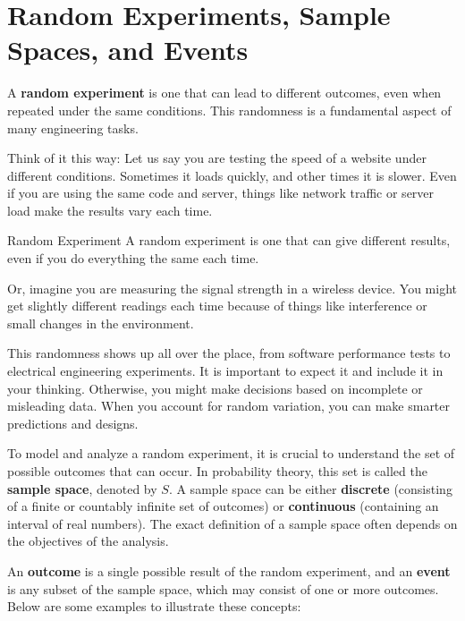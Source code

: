 \section{Random Experiments, Sample Spaces, and Events}
\label{sec:sample_space}
A \textbf{random experiment }is one that can lead to different outcomes, even when repeated under the same conditions. This randomness is a fundamental aspect of many engineering tasks.

Think of it this way: Let us say you are testing the speed of a website under different conditions. Sometimes it loads quickly, and other times it is slower. Even if you are using the same code and server, things like network traffic or server load make the results vary each time.

\begin{definition}{Random Experiment}
    A random experiment is one that can give different results, even if you do everything the same each time.
\end{definition}

Or, imagine you are measuring the signal strength in a wireless device. You might get slightly different readings each time because of things like interference or small changes in the environment.

This randomness shows up all over the place, from software performance tests to electrical engineering experiments. It is important to expect it and include it in your thinking. Otherwise, you might make decisions based on incomplete or misleading data. When you account for random variation, you can make smarter predictions and designs.

To model and analyze a random experiment, it is crucial to understand the set of possible outcomes that can occur. In probability theory, this set is called the \textbf{sample space}, denoted by \( S \). A sample space can be either \textbf{discrete} (consisting of a finite or countably infinite set of outcomes) or \textbf{continuous} (containing an interval of real numbers). The exact definition of a sample space often depends on the objectives of the analysis.

An \textbf{outcome} is a single possible result of the random experiment, and an \textbf{event} is any subset of the sample space, which may consist of one or more outcomes. Below are some examples to illustrate these concepts:

